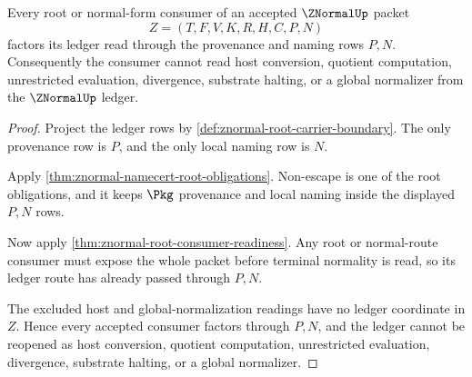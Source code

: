 \begin{theorem}
\label{thm:znormal-ledger-nonescape}
Every root or normal-form consumer of an accepted $\ZNormalUp$ packet
$$
Z=(T,F,V,K,R,H,C,P,N)
$$
factors its ledger read through the provenance and naming rows $P,N$. Consequently the consumer cannot read host conversion, quotient computation, unrestricted evaluation, divergence, substrate halting, or a global normalizer from the $\ZNormalUp$ ledger.
\end{theorem}
\begin{proof}
Project the ledger rows by \autoref{def:znormal-root-carrier-boundary}. The only provenance row is $P$, and the only local naming row is $N$.

Apply \autoref{thm:znormal-namecert-root-obligations}. Non-escape is one of the root obligations, and it keeps $\Pkg$ provenance and local naming inside the displayed $P,N$ rows.

Now apply \autoref{thm:znormal-root-consumer-readiness}. Any root or normal-route consumer must expose the whole packet before terminal normality is read, so its ledger route has already passed through $P,N$.

The excluded host and global-normalization readings have no ledger coordinate in $Z$. Hence every accepted consumer factors through $P,N$, and the ledger cannot be reopened as host conversion, quotient computation, unrestricted evaluation, divergence, substrate halting, or a global normalizer.
\end{proof}
